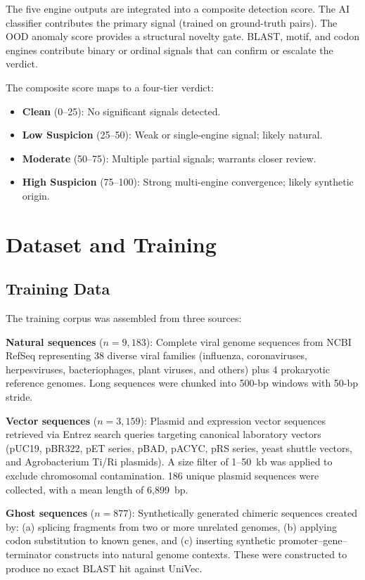 \documentclass[conference]{IEEEtran}
\begin{document}
The five engine outputs are integrated into a composite detection score. The AI classifier contributes the primary signal (trained on ground-truth pairs). The OOD anomaly score provides a structural novelty gate. BLAST, motif, and codon engines contribute binary or ordinal signals that can confirm or escalate the verdict.

The composite score maps to a four-tier verdict:
\begin{itemize}
    \item \textbf{Clean} (0--25): No significant signals detected.
    \item \textbf{Low Suspicion} (25--50): Weak or single-engine signal; likely natural.
    \item \textbf{Moderate} (50--75): Multiple partial signals; warrants closer review.
    \item \textbf{High Suspicion} (75--100): Strong multi-engine convergence; likely synthetic origin.
\end{itemize}

\section{Dataset and Training}
\label{sec:data}

\subsection{Training Data}

The training corpus was assembled from three sources:

\textbf{Natural sequences} ($n = 9{,}183$): Complete viral genome sequences from NCBI RefSeq \cite{ncbi_refseq} representing 38 diverse viral families (influenza, coronaviruses, herpesviruses, bacteriophages, plant viruses, and others) plus 4 prokaryotic reference genomes. Long sequences were chunked into 500-bp windows with 50-bp stride.

\textbf{Vector sequences} ($n = 3{,}159$): Plasmid and expression vector sequences retrieved via Entrez search queries targeting canonical laboratory vectors (pUC19, pBR322, pET series, pBAD, pACYC, pRS series, yeast shuttle vectors, and Agrobacterium Ti/Ri plasmids). A size filter of 1--50~kb was applied to exclude chromosomal contamination. 186 unique plasmid sequences were collected, with a mean length of 6,899~bp.

\textbf{Ghost sequences} ($n = 877$): Synthetically generated chimeric sequences created by: (a) splicing fragments from two or more unrelated genomes, (b) applying codon substitution to known genes, and (c) inserting synthetic promoter--gene--terminator constructs into natural genome contexts. These were constructed to produce no exact BLAST hit against UniVec.
\end{document}
